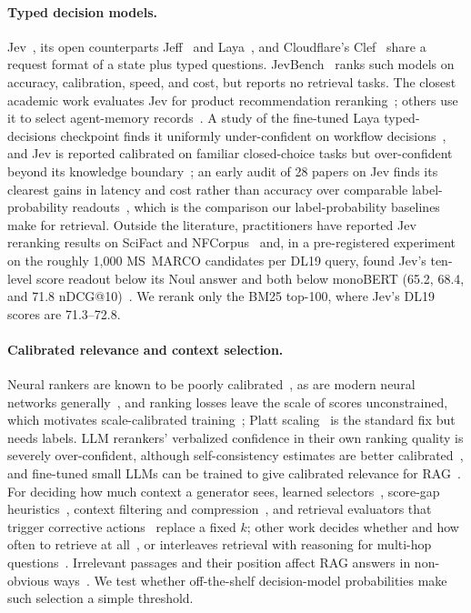 \paragraph{Typed decision models.}
Jev~\cite{jev}, its open counterparts Jeff~\cite{jeff} and Laya~\cite{laya}, and Cloudflare's Clef~\cite{clef} share a request format of a state plus typed questions.
JevBench~\cite{jevbench} ranks such models on accuracy, calibration, speed, and cost, but reports no retrieval tasks.
The closest academic work evaluates Jev for product recommendation reranking~\cite{lyu2026jevrec}; others use it to select agent-memory records~\cite{sharma2026selection}.
A study of the fine-tuned Laya typed-decisions checkpoint finds it uniformly under-confident on workflow decisions~\cite{laya2026assessor}, and Jev is reported calibrated on familiar closed-choice tasks but over-confident beyond its knowledge boundary~\cite{jev2026selfknowledge}; an early audit of 28 papers on Jev finds its clearest gains in latency and cost rather than accuracy over comparable label-probability readouts~\cite{tang2026tdmaudit}, which is the comparison our label-probability baselines make for retrieval.
Outside the literature, practitioners have reported Jev reranking results on SciFact and NFCorpus~\cite{denser2026jevqwen} and, in a pre-registered experiment on the roughly 1{,}000 MS~MARCO candidates per DL19 query, found Jev's ten-level score readout below its Noul answer and both below monoBERT (65.2, 68.4, and 71.8 nDCG@10)~\cite{carlaiau2026protocol}. We rerank only the BM25 top-100, where Jev's DL19 scores are 71.3--72.8.

\paragraph{Calibrated relevance and context selection.}
Neural rankers are known to be poorly calibrated~\cite{penha2021calibration}, as are modern neural networks generally~\cite{guo2017calibration}, and ranking losses leave the scale of scores unconstrained, which motivates scale-calibrated training~\cite{yan2022scale}; Platt scaling~\cite{platt1999} is the standard fix but needs labels. LLM rerankers' verbalized confidence in their own ranking quality is severely over-confident, although self-consistency estimates are better calibrated~\cite{ni2026predict}, and fine-tuned small LLMs can be trained to give calibrated relevance for RAG~\cite{diras2024}.
For deciding how much context a generator sees, learned selectors~\cite{meng2025dps}, score-gap heuristics~\cite{adaptivek2025}, context filtering and compression~\cite{wang2023filco,xu2024recomp,chirkova2025provence}, and retrieval evaluators that trigger corrective actions~\cite{yan2024crag} replace a fixed $k$; other work decides whether and how often to retrieve at all~\cite{asai2024selfrag,jeong2024adaptiverag}, or interleaves retrieval with reasoning for multi-hop questions~\cite{trivedi2023ircot}. Irrelevant passages and their position affect RAG answers in non-obvious ways~\cite{cuconasu2024noise,liu2024lost}.
We test whether off-the-shelf decision-model probabilities make such selection a simple threshold.
